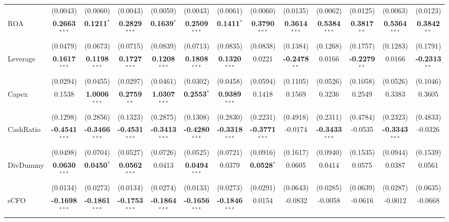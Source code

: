 \documentclass[11pt,a4paper]{article}
\begin{document}
\begin{table}[htbp]
\begin{tabular}{lcccccccccccc}
 & (0.0043) & (0.0060) & (0.0043) & (0.0059) & (0.0043) & (0.0061) & (0.0060) & (0.0135) & (0.0062) & (0.0125) & (0.0063) & (0.0123) \\
ROA & \textbf{0.2663}$^{***}$ & \textbf{0.1211}$^{*}$ & \textbf{0.2829}$^{***}$ & \textbf{0.1639}$^{*}$ & \textbf{0.2509}$^{***}$ & \textbf{0.1411}$^{*}$ & \textbf{0.3790}$^{***}$ & \textbf{0.3614}$^{***}$ & \textbf{0.5384}$^{***}$ & \textbf{0.3817}$^{**}$ & \textbf{0.5364}$^{***}$ & \textbf{0.3842}$^{**}$ \\
 & (0.0479) & (0.0673) & (0.0715) & (0.0839) & (0.0713) & (0.0835) & (0.0838) & (0.1384) & (0.1268) & (0.1757) & (0.1283) & (0.1791) \\
Leverage & \textbf{0.1617}$^{***}$ & \textbf{0.1198}$^{***}$ & \textbf{0.1727}$^{***}$ & \textbf{0.1208}$^{***}$ & \textbf{0.1808}$^{***}$ & \textbf{0.1320}$^{***}$ & 0.0221 & \textbf{-0.2478}$^{**}$ & 0.0166 & \textbf{-0.2279}$^{**}$ & 0.0166 & \textbf{-0.2313}$^{**}$ \\
 & (0.0294) & (0.0455) & (0.0297) & (0.0461) & (0.0302) & (0.0458) & (0.0594) & (0.1105) & (0.0526) & (0.1058) & (0.0526) & (0.1046) \\
Capex & 0.1538 & \textbf{1.0006}$^{***}$ & \textbf{0.2759}$^{**}$ & \textbf{1.0307}$^{***}$ & \textbf{0.2553}$^{*}$ & \textbf{0.9389}$^{***}$ & 0.1418 & 0.1569 & 0.3236 & 0.2549 & 0.3383 & 0.3605 \\
 & (0.1298) & (0.2856) & (0.1323) & (0.2875) & (0.1308) & (0.2830) & (0.2231) & (0.4918) & (0.2311) & (0.4784) & (0.2323) & (0.4833) \\
CashRatio & \textbf{-0.4541}$^{***}$ & \textbf{-0.3466}$^{***}$ & \textbf{-0.4531}$^{***}$ & \textbf{-0.3413}$^{***}$ & \textbf{-0.4280}$^{***}$ & \textbf{-0.3318}$^{***}$ & \textbf{-0.3771}$^{***}$ & -0.0174 & \textbf{-0.3433}$^{***}$ & -0.0535 & \textbf{-0.3343}$^{***}$ & -0.0326 \\
 & (0.0498) & (0.0704) & (0.0527) & (0.0726) & (0.0525) & (0.0721) & (0.0916) & (0.1617) & (0.0940) & (0.1535) & (0.0944) & (0.1539) \\
DivDummy & \textbf{0.0630}$^{***}$ & \textbf{0.0450}$^{*}$ & \textbf{0.0562}$^{***}$ & 0.0413 & \textbf{0.0494}$^{***}$ & 0.0379 & \textbf{0.0528}$^{*}$ & 0.0605 & 0.0414 & 0.0575 & 0.0387 & 0.0561 \\
 & (0.0134) & (0.0273) & (0.0134) & (0.0274) & (0.0133) & (0.0273) & (0.0291) & (0.0643) & (0.0285) & (0.0639) & (0.0287) & (0.0635) \\
sCFO & \textbf{-0.1698}$^{***}$ & \textbf{-0.1861}$^{***}$ & \textbf{-0.1753}$^{***}$ & \textbf{-0.1864}$^{***}$ & \textbf{-0.1656}$^{***}$ & \textbf{-0.1846}$^{***}$ & 0.0154 & -0.0832 & -0.0058 & -0.0616 & -0.0012 & -0.0668 \\

\end{tabular}
\end{table}
\end{document}
